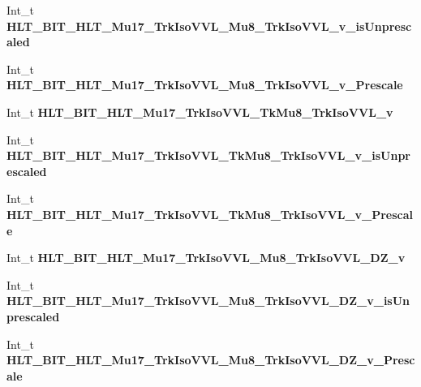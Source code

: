 \begin{DoxyCompactItemize}
Int\+\_\+t {\bfseries H\+L\+T\+\_\+\+B\+I\+T\+\_\+\+H\+L\+T\+\_\+\+Mu17\+\_\+\+Trk\+Iso\+V\+V\+L\+\_\+\+Mu8\+\_\+\+Trk\+Iso\+V\+V\+L\+\_\+v\+\_\+is\+Unprescaled}
\item 
\hypertarget{classMiniTree_ab08ae3d6927d0b723abb304fa33d50f6}{}\label{classMiniTree_ab08ae3d6927d0b723abb304fa33d50f6} 
Int\+\_\+t {\bfseries H\+L\+T\+\_\+\+B\+I\+T\+\_\+\+H\+L\+T\+\_\+\+Mu17\+\_\+\+Trk\+Iso\+V\+V\+L\+\_\+\+Mu8\+\_\+\+Trk\+Iso\+V\+V\+L\+\_\+v\+\_\+\+Prescale}
\item 
\hypertarget{classMiniTree_a02a19d6a1217c646b855564253a02096}{}\label{classMiniTree_a02a19d6a1217c646b855564253a02096} 
Int\+\_\+t {\bfseries H\+L\+T\+\_\+\+B\+I\+T\+\_\+\+H\+L\+T\+\_\+\+Mu17\+\_\+\+Trk\+Iso\+V\+V\+L\+\_\+\+Tk\+Mu8\+\_\+\+Trk\+Iso\+V\+V\+L\+\_\+v}
\item 
\hypertarget{classMiniTree_ac23e3a34f1cb2b0b0bf3a80ec5902895}{}\label{classMiniTree_ac23e3a34f1cb2b0b0bf3a80ec5902895} 
Int\+\_\+t {\bfseries H\+L\+T\+\_\+\+B\+I\+T\+\_\+\+H\+L\+T\+\_\+\+Mu17\+\_\+\+Trk\+Iso\+V\+V\+L\+\_\+\+Tk\+Mu8\+\_\+\+Trk\+Iso\+V\+V\+L\+\_\+v\+\_\+is\+Unprescaled}
\item 
\hypertarget{classMiniTree_a72923e19eae1bb359ca3d9b7a3952511}{}\label{classMiniTree_a72923e19eae1bb359ca3d9b7a3952511} 
Int\+\_\+t {\bfseries H\+L\+T\+\_\+\+B\+I\+T\+\_\+\+H\+L\+T\+\_\+\+Mu17\+\_\+\+Trk\+Iso\+V\+V\+L\+\_\+\+Tk\+Mu8\+\_\+\+Trk\+Iso\+V\+V\+L\+\_\+v\+\_\+\+Prescale}
\item 
\hypertarget{classMiniTree_ad24ee985404eb20e1e3f1daba57d9ad1}{}\label{classMiniTree_ad24ee985404eb20e1e3f1daba57d9ad1} 
Int\+\_\+t {\bfseries H\+L\+T\+\_\+\+B\+I\+T\+\_\+\+H\+L\+T\+\_\+\+Mu17\+\_\+\+Trk\+Iso\+V\+V\+L\+\_\+\+Mu8\+\_\+\+Trk\+Iso\+V\+V\+L\+\_\+\+D\+Z\+\_\+v}
\item 
\hypertarget{classMiniTree_af1d4d04b209f8998dc5f86b7da809179}{}\label{classMiniTree_af1d4d04b209f8998dc5f86b7da809179} 
Int\+\_\+t {\bfseries H\+L\+T\+\_\+\+B\+I\+T\+\_\+\+H\+L\+T\+\_\+\+Mu17\+\_\+\+Trk\+Iso\+V\+V\+L\+\_\+\+Mu8\+\_\+\+Trk\+Iso\+V\+V\+L\+\_\+\+D\+Z\+\_\+v\+\_\+is\+Unprescaled}
\item 
\hypertarget{classMiniTree_aa6c8cc0d2d837783d11c2b533856160b}{}\label{classMiniTree_aa6c8cc0d2d837783d11c2b533856160b} 
Int\+\_\+t {\bfseries H\+L\+T\+\_\+\+B\+I\+T\+\_\+\+H\+L\+T\+\_\+\+Mu17\+\_\+\+Trk\+Iso\+V\+V\+L\+\_\+\+Mu8\+\_\+\+Trk\+Iso\+V\+V\+L\+\_\+\+D\+Z\+\_\+v\+\_\+\+Prescale}
\item 
\hypertarget{classMiniTree_a86f9b0843eb54ab6aae72f4fcbdc6cee}{}\label{classMiniTree_a86f9b0843eb54ab6aae72f4fcbdc6cee} 

\end{DoxyCompactItemize}
